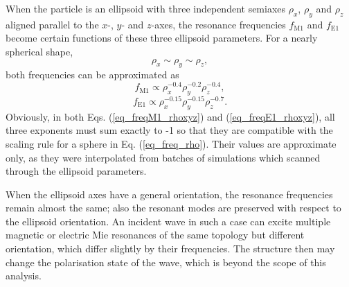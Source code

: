 When the particle is an ellipsoid with three independent semiaxes $\rho_x$, $\rho_y$ and $\rho_z$ aligned parallel to the $x$-, $y$- and $z$-axes, the resonance frequencies $f_{\text{M1}}$ and $f_{\text{E1}}$ become certain functions of these three ellipsoid parameters. For a nearly spherical shape, 
$$\rho_x \sim \rho_y \sim \rho_z,$$
both frequencies can be approximated as 
\begin{equation}  f_{\text{M1}} \propto \rho_x^{-0.4}  \rho_y^{-0.2} \rho_z^{-0.4}, \label{eq_freqM1_rhoxyz}\end{equation}
\begin{equation}  f_{\text{E1}} \propto \rho_x^{-0.15}  \rho_y^{-0.15} \rho_z^{-0.7}. \label{eq_freqE1_rhoxyz}\end{equation}
Obviously,  in both Eqs. (\ref{eq_freqM1_rhoxyz}) and (\ref{eq_freqE1_rhoxyz}), all three exponents must sum exactly to -1 so that they are compatible with the scaling rule for a sphere in Eq. (\ref{eq_freq_rho}). Their values are approximate only, as they were interpolated from batches of simulations which scanned through the ellipsoid parameters.

When the ellipsoid axes have a general orientation, the resonance frequencies remain almost the same; also the resonant modes are  preserved with respect to the ellipsoid orientation. An incident wave in such a case can excite multiple magnetic or electric Mie resonances of the same topology but different orientation, which differ slightly by their frequencies. The structure then may change the polarisation state of the wave, which is beyond the scope of this analysis.

